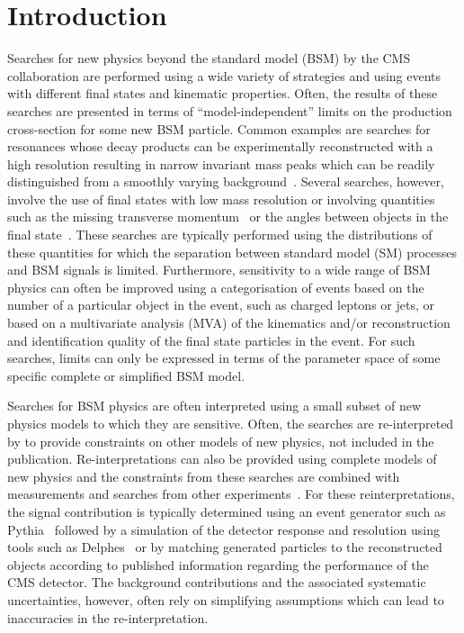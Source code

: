 \section{Introduction}
\label{sec:intro}

Searches for new physics beyond the standard model (BSM) by the CMS collaboration are performed using a wide variety of 
strategies and using events with different final states and kinematic properties.  Often, 
the results of these searches are presented in terms of ``model-independent'' limits on the production 
cross-section for some new BSM particle. Common examples are searches for resonances whose decay products 
can be experimentally reconstructed with a high resolution resulting in narrow invariant mass peaks which can be readily distinguished from 
a smoothly varying background~\cite{Khachatryan:2016yec}. Several searches, however, involve the use of final states with low mass resolution or involving 
quantities such as the missing transverse momentum~\cite{Khachatryan:2011tk,Khachatryan:2016mdm} or the angles between objects in the final state~\cite{Khachatryan:2015pua}. 
These searches are typically performed using the 
distributions of these quantities for which the separation between standard model (SM) processes and BSM signals is limited. Furthermore, 
sensitivity to a wide range of BSM physics can often be improved using a categorisation of events based on the number of a particular 
object in the event, such as charged leptons or jets, or based on a multivariate analysis (MVA) of the kinematics and/or reconstruction and 
identification quality of the final state particles in the event. For such searches, limits can only be expressed in terms of the 
parameter space of some specific complete or simplified BSM model.

Searches for BSM physics are often interpreted using a small subset of new physics 
models to which they are sensitive. Often, the searches are re-interpreted by 
to provide constraints on other models of new physics, not included in the publication.
Re-interpretations can also be provided using complete models of new physics and the constraints from 
these searches are combined with measurements and searches from other experiments~\cite{mastercode}. 
For these reinterpretations, the signal contribution is typically determined using an event generator 
such as {\sc Pythia}~\cite{pythia} followed by a simulation of the detector 
response and resolution using tools such as {\sc Delphes}~\cite{delphes} or by matching generated particles to
the reconstructed objects according to published information regarding the performance of the CMS detector. 
The background contributions and the associated systematic uncertainties, however, often rely
on simplifying assumptions which can lead to inaccuracies in the re-interpretation. 

